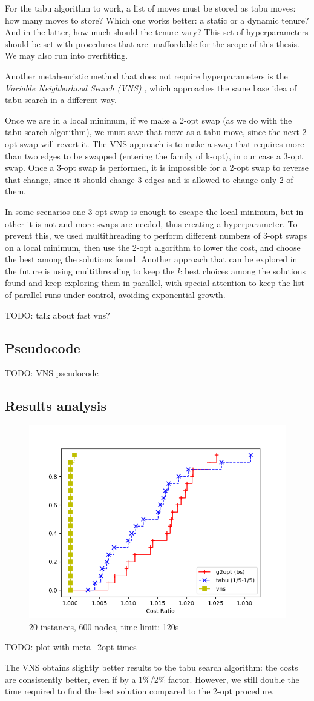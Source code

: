 For the tabu algorithm to work, a list of moves must be stored as tabu moves: how many moves to store? Which one works better: a static or a dynamic tenure? And in the latter, how much should the tenure vary? This set of hyperparameters should be set with procedures that are unaffordable for the scope of this thesis. We may also run into overfitting.

Another metaheuristic method that does not require hyperparameters is the \textit{Variable Neighborhood Search (VNS)} \cite{Hansen2019}, which approaches the same base idea of tabu search in a different way.

Once we are in a local minimum, if we make a 2-opt swap (as we do with the tabu search algorithm), we must save that move as a tabu move, since the next 2-opt swap will revert it. The VNS approach is to make a swap that requires more than two edges to be swapped (entering the family of k-opt), in our case a 3-opt swap. Once a 3-opt swap is performed, it is impossible for a 2-opt swap to reverse that change, since it should change 3 edges and is allowed to change only 2 of them.

In some scenarios one 3-opt swap is enough to escape the local minimum, but in other it is not and more swaps are needed, thus creating a hyperparameter. To prevent this, we used multithreading to perform different numbers of 3-opt swaps on a local minimum, then use the 2-opt algorithm to lower the cost, and choose the best among the solutions found. Another approach that can be explored in the future is using multithreading to keep the $k$ best choices among the solutions found and keep exploring them in parallel, with special attention to keep the list of parallel runs under control, avoiding exponential growth.

TODO: talk about fast vns?

\subsection{Pseudocode}

TODO: VNS pseudocode

\subsection{Results analysis}

\FloatBarrier
\begin{figure}[h]
    \centering
    \includegraphics*[width=.6\textwidth]{../plots/perfprof_met_costs_result.png}
    \caption*{20 instances, 600 nodes, time limit: 120s}
\end{figure}

TODO: plot with meta+2opt times

The VNS obtains slightly better results to the tabu search algorithm: the costs are consistently better, even if by a 1\%/2\% factor. However, we still double the time required to find the best solution compared to the 2-opt procedure.